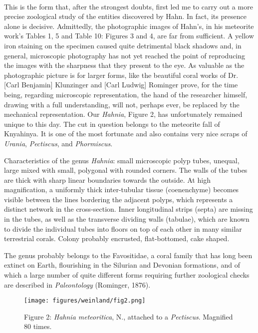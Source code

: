 \documentclass[a4paper, 12pt, oneside]{article}
\begin{document}
\paragraph*{}
This is the form that, after the strongest doubts, first led me to carry out a more precise zoological study of the entities discovered by Hahn. In fact, its presence alone is decisive. Admittedly, the photographic images of Hahn's, in his meteorite work's Tables 1, 5 and Table 10: Figures 3 and 4, are far from sufficient. A yellow iron staining on the specimen caused quite detrimental black shadows and, in general, microscopic photography has not yet reached the point of reproducing the images with the sharpness that they present to the eye. As valuable as the photographic picture is for larger forms, like the beautiful coral works of Dr. [Carl Benjamin] Klunzinger and [Carl Ludwig] Rominger prove, for the time being, regarding microscopic representation, the hand of the researcher himself, drawing with a full understanding, will not, perhaps ever, be replaced by the mechanical representation. Our \emph{Hahnia}, Figure 2, has unfortunately remained unique to this day. The cut in question belongs to the meteorite fall of Knyahinya. It is one of the most fortunate and also contains very nice scraps of \emph{Urania}, \emph{Pectiscus}, and \emph{Phormiscus}.

Characteristics of the genus \emph{Hahnia}: small microscopic polyp tubes, unequal, large mixed with small, polygonal with rounded corners. The walls of the tubes are thick with sharp linear boundaries towards the outside. At high magnification, a uniformly thick inter-tubular tissue (coenenchyme) becomes visible between the lines bordering the adjacent polyps, which represents a distinct network in the cross-section. Inner longitudinal strips (septa) are missing in the tubes, as well as the transverse dividing walls (tabulae), which are known to divide the individual tubes into floors on top of each other in many similar terrestrial corals. Colony probably encrusted, flat-bottomed, cake shaped.

The genus probably belongs to the Favositidae, a coral family that has long been extinct on Earth, flourishing in the Silurian and Devonian formations, and of which a large number of quite different forms requiring further zoological checks are described in \emph{Paleontology} (Rominger, 1876).
\begin{figure}[H]
\centering
\texttt{[image: figures/weinland/fig2.png]}
\caption{Figure 2: \emph{Hahnia meteoritica}, N., attached to a \emph{Pectiscus}. Magnified 80 times.}
\end{figure}
\end{document}
